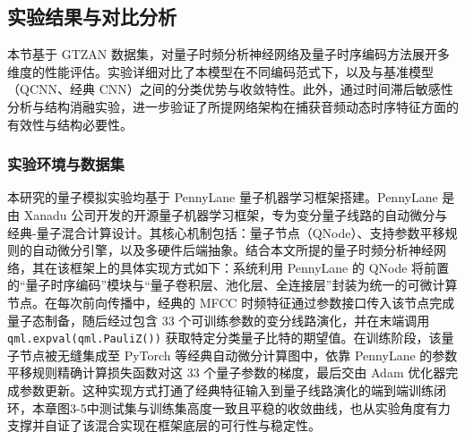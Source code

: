 \subsection{实验结果与对比分析}
\label{sec:experiment_and_discussion}

本节基于 GTZAN 数据集，对量子时频分析神经网络及量子时序编码方法展开多维度的性能评估。实验详细对比了本模型在不同编码范式下，以及与基准模型（QCNN、经典 CNN）之间的分类优势与收敛特性。此外，通过时间滞后敏感性分析与结构消融实验，进一步验证了所提网络架构在捕获音频动态时序特征方面的有效性与结构必要性。

\subsubsection{实验环境与数据集}
\label{subsec:experimental_setup}

本研究的量子模拟实验均基于 PennyLane 量子机器学习框架搭建。PennyLane 是由 Xanadu 公司开发的开源量子机器学习框架，专为变分量子线路的自动微分与经典-量子混合计算设计。其核心机制包括：量子节点（QNode）、支持参数平移规则的自动微分引擎，以及多硬件后端抽象。结合本文所提的量子时频分析神经网络，其在该框架上的具体实现方式如下：系统利用 PennyLane 的 QNode 将前置的“量子时序编码”模块与“量子卷积层、池化层、全连接层”封装为统一的可微计算节点。在每次前向传播中，经典的 MFCC 时频特征通过参数接口传入该节点完成量子态制备，随后经过包含 33 个可训练参数的变分线路演化，并在末端调用 \texttt{qml.expval(qml.PauliZ())} 获取特定分类量子比特的期望值。在训练阶段，该量子节点被无缝集成至 PyTorch 等经典自动微分计算图中，依靠 PennyLane 的参数平移规则精确计算损失函数对这 33 个量子参数的梯度，最后交由 Adam 优化器完成参数更新。这种实现方式打通了经典特征输入到量子线路演化的端到端训练闭环，本章图3-5中测试集与训练集高度一致且平稳的收敛曲线，也从实验角度有力支撑并自证了该混合实现在框架底层的可行性与稳定性。

